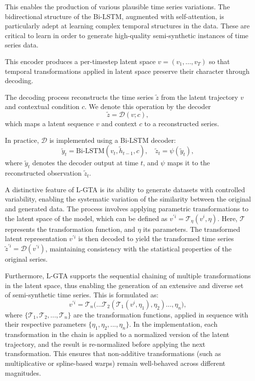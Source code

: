 This enables the production of various plausible time series variations. The bidirectional structure of the Bi-LSTM, augmented with self-attention, is particularly adept at learning complex temporal structures in the data. These are critical to learn in order to generate high-quality semi-synthetic instances of time series data.

This encoder produces a per-timestep latent space $v = (v_1, \dots, v_T)$ so that temporal transformations applied in latent space preserve their character through decoding.

The decoding process reconstructs the time series $\tilde{z}$ from the latent trajectory $v$ and contextual condition $c$. We denote this operation by the decoder
\begin{equation}
\tilde{z} = \mathcal{D}(v; c),
\end{equation}
which maps a latent sequence $v$ and context $c$ to a reconstructed series.

In practice, $\mathcal{D}$ is implemented using a Bi-LSTM decoder:
\begin{equation}
\tilde{y}_t = \mathrm{Bi\text{-}LSTM}(v_t, \tilde{h}_{t-1}, c), \quad
\tilde{z}_t = \psi(\tilde{y}_t),
\end{equation}
where $\tilde{y}_t$ denotes the decoder output at time $t$, and $\psi$ maps it to the reconstructed observation $\tilde{z}_t$.


A distinctive feature of L-GTA is its ability to generate datasets with controlled variability, enabling the systematic variation of the similarity between the original and generated data. The process involves applying parametric transformations to the latent space of the model, which can be defined as $v^{\prime i} = \mathcal{T}_{\eta}(v^{i}, \eta)$. Here, $\mathcal{T}$ represents the transformation function, and $\eta$ its parameters. The transformed latent representation $v^{\prime i}$ is then decoded to yield the transformed time series $\tilde{z}^{\prime i} = \mathcal{D}(v^{\prime i})$, maintaining consistency with the statistical properties of the original series.

Furthermore, L-GTA supports the sequential chaining of multiple transformations in the latent space, thus enabling the generation of an extensive and diverse set of semi-synthetic time series. This is formulated as:
%
\begin{equation}
v^{\prime i} = \mathcal{T}_n\bigl( \dots \mathcal{T}_2(\mathcal{T}_1(v^{i}, \eta_1), \eta_2) \dots, \eta_n \bigr),
\end{equation}
%
where $\{\mathcal{T}_1, \mathcal{T}_2, ..., \mathcal{T}_n\}$ are the transformation functions, applied in sequence with their respective parameters $\{\eta_1, \eta_2, ..., \eta_n\}$. In the implementation, each transformation in the chain is applied to a normalized version of the latent trajectory, and the result is re-normalized before applying the next transformation. This ensures that non-additive transformations (such as multiplicative or spline-based warps) remain well-behaved across different magnitudes.


